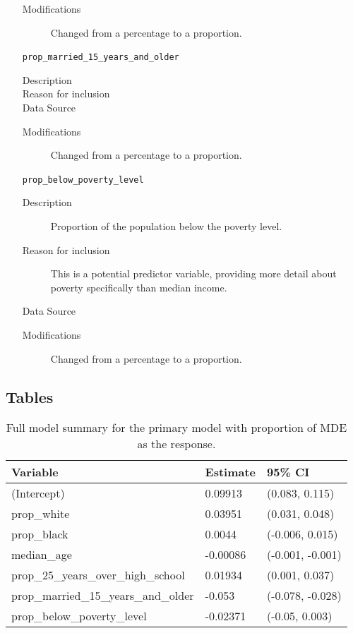\documentclass{article}
\begin{document}
\begin{itemize}[label={}, align=left]
\begin{description}
              \item[Modifications] Changed from a percentage to a proportion.
          \end{description}
    \item[\texttt{prop\_married\_15\_years\_and\_older}] \
          \begin{description}
              \item[Description] 
              \item[Reason for inclusion] \maritalreason
              \item[Data Source] \cite{acs_education_data}
              \item[Modifications] Changed from a percentage to a proportion.
          \end{description}
    \item[\texttt{prop\_below\_poverty\_level}] \
          \begin{description}
              \item[Description] Proportion of the population below the poverty level.
              \item[Reason for inclusion] This is a potential predictor
                    variable, providing more detail about poverty specifically
                    than median income.
              \item[Data Source] \cite{acs_poverty_data}
              \item[Modifications] Changed from a percentage to a proportion.
          \end{description}
\end{itemize}

\pagebreak

\subsection{Tables}


\begin{table}[!htb]
\begin{center}
\begin{tabular}{lll}
    \toprule
    Variable & Estimate & 95\% CI\\
    \midrule
    (Intercept) & 0.09913 & (0.083, 0.115)\\
    prop\_white & 0.03951 & (0.031, 0.048)\\
    prop\_black & 0.0044 & (-0.006, 0.015)\\
    median\_age & -0.00086 & (-0.001, -0.001)\\
    prop\_25\_years\_over\_high\_school & 0.01934 & (0.001, 0.037)\\
    prop\_married\_15\_years\_and\_older & -0.053 & (-0.078, -0.028)\\
    prop\_below\_poverty\_level & -0.02371 & (-0.05, 0.003)\\
    \bottomrule
\end{tabular}
\end{center}
\caption{\label{tab:primary-mde-full-summary}
    Full model summary for the primary model with
    proportion of MDE
    as the response.
}
\end{table}
\end{document}
